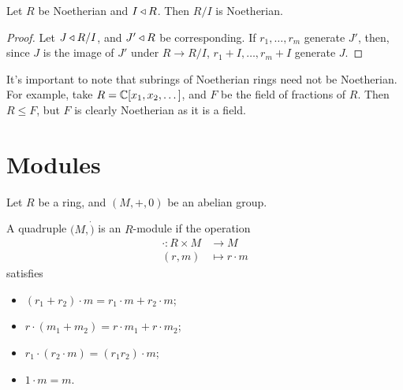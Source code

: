 \documentclass{../template/note}
\begin{document}
    \begin{proposition}
        Let $R$ be Noetherian and $I \triangleleft R$. Then $R/I$ is Noetherian.
    \end{proposition}
    
    \begin{proof}
        Let $J \triangleleft R/I$, and $J' \triangleleft R$ be corresponding. If $r_1, \dots, r_m$ generate $J'$, then, since $J$ is the image of $J'$ under $R \to R/I$, $r_1+I, \dots, r_m+I$ generate $J$.
    \end{proof}
    
    \begin{remark*}
        It's important to note that subrings of Noetherian rings need not be Noetherian. For example, take $R = \mathbb C[x_1, x_2, \dots]$, and $F$ be the field of fractions of $R$. Then $R \leq F$, but $F$ is clearly Noetherian as it is a field.
    \end{remark*}
    
    \section{Modules}

    Let $R$ be a ring, and $(M, +, 0)$ be an abelian group.

    \begin{definition}[Module]
        A quadruple $(M, \dot)$ is an $R$-module if the operation
        \begin{align*}
            \cdot: R \times M &\to M \\
            (r, m) &\mapsto r \cdot m
        \end{align*}
        satisfies
        \begin{itemize}
            \item $(r_1+r_2) \cdot m = r_1 \cdot m + r_2 \cdot m$;
            \item $r \cdot (m_1+m_2) = r \cdot m_1 + r \cdot m_2$;
            \item $r_1 \cdot (r_2 \cdot m) = (r_1r_2) \cdot m$;
            \item $1 \cdot m = m$.
        \end{itemize}
    \end{definition}
    
\end{document}
